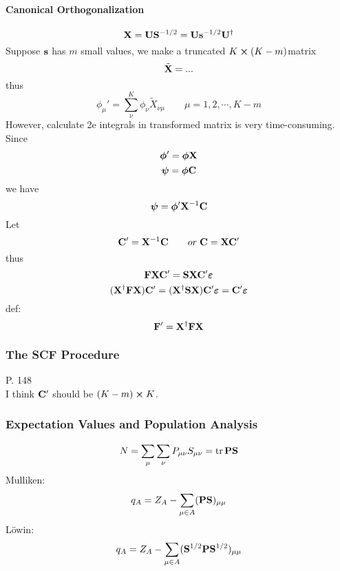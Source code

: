 \documentclass[a4paper]{article}
\numberwithin{equation}{section}
\begin{document}
\paragraph{Canonical Orthogonalization}
\begin{equation}\label{key}
\vb{X} = \vb{U}\vb{S}^{-1/2} = \vb{U}\vb{s}^{-1/2}\vb{U}^\dagger
\end{equation}
Suppose $ \vb{s} $ has $ m $ small values, we make a truncated $ K\cross (K-m) $matrix
\begin{equation}\label{key}
\tilde{\vb{X}} = ...
\end{equation}
thus
\begin{equation}\label{key}
\phi_\mu' = \sum_\nu^K \phi_\nu \tilde{X}_{\nu\mu} \qquad \mu = 1,2,\cdots,K-m
\end{equation}
However, calculate 2e integrals in transformed matrix is very time-consuming.\\
Since
\begin{equation}\label{key}
\bm\phi' = \bm\phi \vb{X}
\end{equation}
\begin{equation}\label{key}
\bm\psi = \bm\phi \vb{C}
\end{equation}
we have
\begin{equation}\label{key}
\bm\psi = \bm\phi' \vb{X}^{-1} \vb{C}
\end{equation}
Let
\begin{equation}\label{key}
\vb{C}' = \vb{X}^{-1} \vb{C} \qquad or \; \vb{C} = \vb{X}\vb{C}'
\end{equation}
thus
\begin{equation}\label{key}
\vb{F} \vb{X}\vb{C}' = \vb{S} \vb{X}\vb{C}' \bm\varepsilon
\end{equation}
\begin{equation}\label{key}
(\vb{X}^\dagger \vb{F}\vb{X}) \vb{C}' = (\vb{X}^\dagger \vb{S}\vb{X}) \vb{C}' \bm\varepsilon = \vb{C}'\bm\varepsilon 
\end{equation}
def:
\begin{equation}\label{key}
\vb{F}' = \vb{X}^\dagger \vb{F}\vb{X}
\end{equation}

\subsubsection{The SCF Procedure}
P. 148\\
I think $ \vb{C}' $ should be $ (K-m)\cross K $.

\subsubsection{Expectation Values and Population Analysis}
\begin{equation}\label{key}
N = \sum_\mu\sum_\nu P_{\mu\nu} S_{\mu\nu} = \tr \vb{PS}
\end{equation}
Mulliken:
\begin{equation}\label{key}
q_A = Z_A - \sum_{\mu\in A}(\vb{PS})_{\mu\mu}
\end{equation}
L\"owin:
\begin{equation}\label{key}
q_A = Z_A - \sum_{\mu\in A}(\vb{S}^{1/2} \vb{P} \vb{S}^{1/2})_{\mu\mu}
\end{equation}
\end{document}
